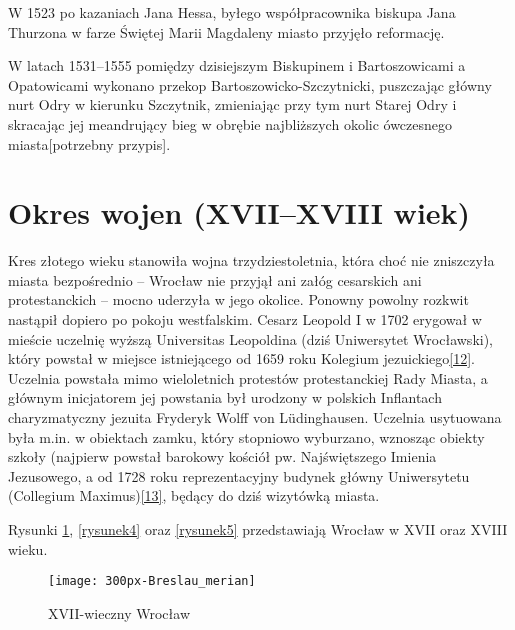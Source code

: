 \documentclass{article}
\begin{document}
\vspace{6pt}

\noindent W 1523 po kazaniach Jana Hessa, byłego współpracownika biskupa Jana Thurzona w farze Świętej Marii Magdaleny miasto przyjęło reformację.

\vspace{6pt}

\noindent W latach 1531–1555 pomiędzy dzisiejszym Biskupinem i Bartoszowicami a Opatowicami wykonano przekop Bartoszowicko-Szczytnicki, puszczając główny nurt Odry w kierunku Szczytnik, zmieniając przy tym nurt Starej Odry i skracając jej meandrujący bieg w obrębie najbliższych okolic ówczesnego miasta[potrzebny przypis].

\section* {Okres wojen (XVII–XVIII wiek)}
Kres złotego wieku stanowiła wojna trzydziestoletnia, która choć nie zniszczyła miasta bezpośrednio – Wrocław nie przyjął ani załóg cesarskich ani protestanckich – mocno uderzyła w jego okolice. Ponowny powolny rozkwit nastąpił dopiero po pokoju westfalskim. Cesarz Leopold I w 1702 erygował w mieście uczelnię wyższą Universitas Leopoldina (dziś Uniwersytet Wrocławski), który powstał w miejsce istniejącego od 1659 roku Kolegium jezuickiego\hyperref[12]{[12]}\label{112}. Uczelnia powstała mimo wieloletnich protestów protestanckiej Rady Miasta, a głównym inicjatorem jej powstania był urodzony w polskich Inflantach charyzmatyczny jezuita Fryderyk Wolff von Lüdinghausen. Uczelnia usytuowana była m.in. w obiektach zamku, który stopniowo wyburzano, wznosząc obiekty szkoły (najpierw powstał barokowy kościół pw. Najświętszego Imienia Jezusowego, a od 1728 roku reprezentacyjny budynek główny Uniwersytetu (Collegium Maximus)\hyperref[13]{[13]}\label{113}, będący do dziś wizytówką miasta.

\vspace{6pt}

\noindent Rysunki \ref{rysunek3}, \ref{rysunek4} oraz \ref{rysunek5} przedstawiają Wrocław w XVII oraz XVIII wieku.

\begin{figure}[h]
\centering

\texttt{[image: 300px-Breslau\_merian]}
\caption{XVII-wieczny Wrocław}
\label{rysunek3}

\end{figure}
\end{document}
